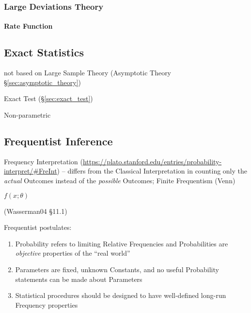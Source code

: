 \subsubsection{Large Deviations Theory}\label{sec:large_deviations_theory}

\paragraph{Rate Function}\label{sec:rate_function}\hfill



\subsection{Exact Statistics}\label{sec:exact_statistics}

not based on Large Sample Theory (Asymptotic Theory
\S\ref{sec:asymptotic_theory})

\fist Exact Test (\S\ref{sec:exact_test})

Non-parametric



\subsection{Frequentist Inference}\label{sec:frequentist_inference}

Frequency Interpretation
(\url{https://plato.stanford.edu/entries/probability-interpret/#FreInt}) --
differs from the Classical Interpretation in counting only the \emph{actual}
Outcomes instead of the \emph{possible} Outcomes; Finite Frequentism (Venn)

$f(x; \theta)$

(Wasserman04 \S11.1)

Frequentist postulates:
\begin{enumerate}
  \item Probability refers to limiting Relative Frequencies and Probabilities
    are \emph{objective} properties of the ``real world''
  \item Parameters are fixed, unknown Constants, and no useful Probability
    statements can be made about Parameters
  \item Statistical procedures should be designed to have well-defined long-run
    Frequency properties
\end{enumerate}


